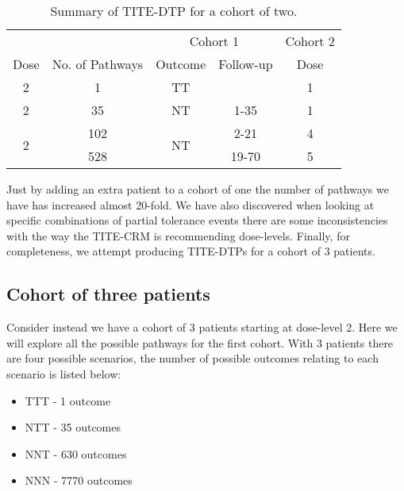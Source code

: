 \begin{table}[H]
	\centering
	\caption{Summary of TITE-DTP for a cohort of two.}
	\label{tab_tite-dtp:TITEDTP_c2_Sum}
	\begin{tabular}{ccccc}
		\hline
		\multicolumn{1}{l}{} &                 & \multicolumn{2}{c}{Cohort 1}    & Cohort 2 \\ 
		\cmidrule(l{3pt}r{3pt}){3-4} \cmidrule(l{3pt}r{3pt}){5-5}
		Dose                 & No. of Pathways & Outcome             & Follow-up & Dose     \\ \hline
		2                    & 1               & TT                  &           & 1        \\ \hline
		2                    & 35              & NT                  & 1-35      & 1        \\ \hline
		\multirow{2}{*}{2}   & 102             & \multirow{2}{*}{NT} & 2-21      & 4        \\
		& 528             &                     & 19-70     & 5        \\ \hline
	\end{tabular}
\end{table}

Just by adding an extra patient to a cohort of one the number of pathways we have has increased almost 20-fold. We have also discovered when looking at specific combinations of partial tolerance events there are some inconsistencies with the way the TITE-CRM is recommending dose-levels. Finally, for completeness, we attempt producing TITE-DTPs for a cohort of 3 patients.   


\subsection{Cohort of three patients}
Consider instead we have a cohort of 3 patients starting at dose-level 2. Here we will explore all the possible pathways for the first cohort. With 3 patients there are four possible scenarios, the number of possible outcomes relating to each scenario is listed below: 

\begin{itemize}
	\item TTT - 1 outcome 
	\item NTT - 35 outcomes 
	\item NNT - 630 outcomes 
	\item NNN - 7770 outcomes 
\end{itemize}

